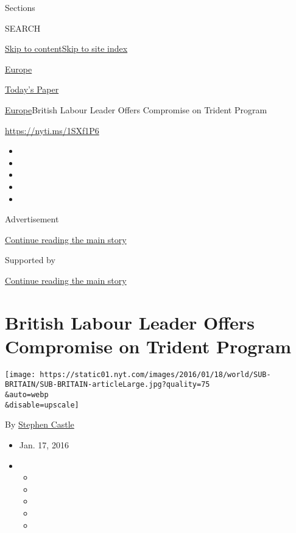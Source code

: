 Sections

SEARCH

\protect\hyperlink{site-content}{Skip to
content}\protect\hyperlink{site-index}{Skip to site index}

\href{https://www.nytimes.com/section/world/europe}{Europe}

\href{https://myaccount.nytimes.com/auth/login?response_type=cookie\&client_id=vi}{}

\href{https://www.nytimes.com/section/todayspaper}{Today's Paper}

\href{/section/world/europe}{Europe}\textbar{}British Labour Leader
Offers Compromise on Trident Program

\url{https://nyti.ms/1SXf1P6}

\begin{itemize}
\item
\item
\item
\item
\item
\end{itemize}

Advertisement

\protect\hyperlink{after-top}{Continue reading the main story}

Supported by

\protect\hyperlink{after-sponsor}{Continue reading the main story}

\hypertarget{british-labour-leader-offers-compromise-on-trident-program}{%
\section{British Labour Leader Offers Compromise on Trident
Program}\label{british-labour-leader-offers-compromise-on-trident-program}}

\texttt{[image: https://static01.nyt.com/images/2016/01/18/world/SUB-BRITAIN/SUB-BRITAIN-articleLarge.jpg?quality=75\\\&auto=webp\\\&disable=upscale]}

By \href{http://www.nytimes.com/by/stephen-castle}{Stephen Castle}

\begin{itemize}
\item
  Jan. 17, 2016
\item
  \begin{itemize}
  \item
  \item
  \item
  \item
  \item
  \end{itemize}
\end{itemize}

